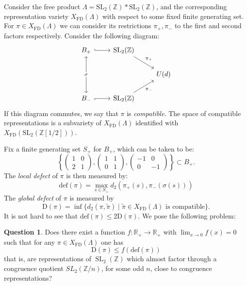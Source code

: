 \documentclass[11pt]{amsart}
\DeclareMathOperator{\SL}{SL}
\newcommand{\R}{{\mathbb{R}}}
\newcommand{\Z}{{\mathbb{Z}}}
\theoremstyle{definition}
\theoremstyle{remark}
\theoremstyle{definition}
\newtheorem{question}[theorem]{Question}
\begin{document}
Consider the free product $\Lambda=\mathrm{SL}_2(\Z)*\mathrm{SL}_2(\Z)$, and the corresponding representation variety $X_{\mathrm{FD}}(\Lambda)$ with respect to some fixed finite generating set. 
For $\pi \in X_{\mathrm{FD}}(\Lambda)$ we can consider its restrictions $\pi_+,\pi_-$ to the first and second factors respectively.
Consider the following diagram:
\[\begin{tikzcd}
	{{B}_+} & {\mathrm{SL}_2 (\mathbb Z)} \\
	{} & {} & {U(d)} \\
	{{B}_-} & {\mathrm{SL}_2 (\mathbb Z)}
	\arrow[hook, from=1-1, to=1-2]
	\arrow["\sigma"{description},leftrightarrow, from=1-1, to=3-1]
	\arrow["{\pi_+}", from=1-2, to=2-3]
	\arrow[hook', from=3-1, to=3-2]
	\arrow["{\pi_-}"', from=3-2, to=2-3]
\end{tikzcd}\]
If this diagram commutes, we say that $\pi$
is \textit{compatible}. The space of  compatible representations is a subvariety of $X_{\mathrm{FD}}(\Lambda)$ identified with $X_{\mathrm{FD}}(\mathrm{SL}_2(\Z[1/2]))$.

Fix a finite generating set $S_{+}$ for ${B}_{+}$, which can be taken to be:
\[
\left\{ \left(\begin{array}{cc}
1 & 0\\
2 & 1
\end{array}\right),\left(\begin{array}{cc}
1 & 1\\
0 & 1
\end{array}\right),\left(\begin{array}{cc}
-1 & 0\\
0 & -1
\end{array}\right)\right\} \subset {B}_+ .
\]
The \emph{local defect} of $\pi$ is then measured by:
\[
\mathrm{def}(\pi)=\max_{s \in S_+} d_2(\pi_{+}(s),\pi_{-}(\sigma(s)))
\]
The \emph{global defect} of $\pi$ is measured by
\[
    \mathrm{D}(\pi)=\inf\{d_2(\pi,\tilde{\pi})\mid \tilde{\pi}\in X_{\mathrm{FD}}(\Lambda) \text{ is compatible}\}.
\]
It is not hard to see that $\mathrm{def}(\pi)\leq 2\mathrm{D}(\pi)$.  We pose the following problem:
\begin{question}
    \label{problem!}
Does there exist a  function $f:\R_+\to \R_+$ with $\lim_{x\to 0} f(x)=0$ such that for any  $\pi\in X_{\mathrm{FD}}(\Lambda)$ one has
\[
\mathrm{D}(\pi)\leq f(\mathrm{def}(\pi))
\]
that is, are representations of $\SL_2(\Z)$ which almost factor through a congruence quotient $SL_2(\mathbb Z/n)$, for some odd $n$, close to congruence representations?
\end{question}
\end{document}
